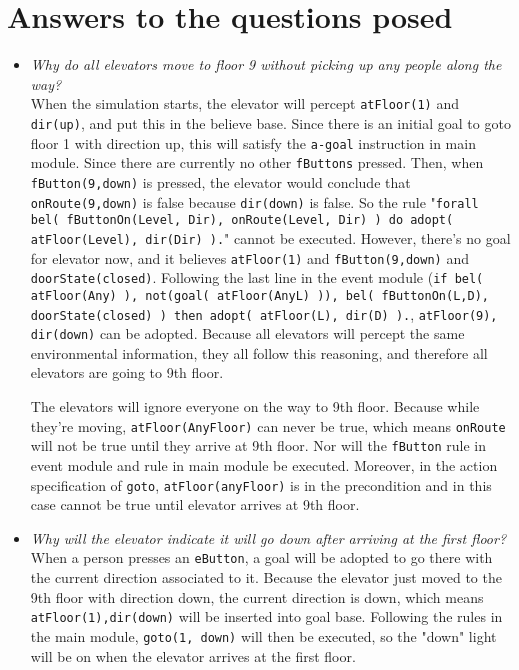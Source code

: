 \documentclass[a4paper,10pt,twocolumn]{article}
\begin{document}
\section{Answers to the questions posed}
\begin{itemize}
 \item \emph{Why do all elevators move to floor 9 without picking up any people along the way?}\\
 When the simulation starts, the elevator will percept \texttt{atFloor(1)} and \texttt{dir(up)}, and put this in the believe base. Since there is an initial goal to goto floor 1 with direction up, this will satisfy the \texttt{a-goal} instruction in main module. Since there are currently no other \texttt{fButtons} pressed. 
 Then, when \texttt{fButton(9,down)} is pressed, the elevator would conclude that \texttt{onRoute(9,down)} is false because \texttt{dir(down)} is false. So the rule "\texttt{forall bel( fButtonOn(Level, Dir), onRoute(Level, Dir) ) do adopt( atFloor(Level), dir(Dir) ).}" cannot be executed. However, there's no goal for elevator now, and it believes \texttt{atFloor(1)} and \texttt{fButton(9,down)} and \texttt{doorState(closed)}. Following the last line in the event module (\texttt{if bel( atFloor(Any) ), not(goal( atFloor(AnyL) )), bel( fButtonOn(L,D), doorState(closed) )
then adopt( atFloor(L), dir(D) ).}, \texttt{atFloor(9), dir(down)} can be adopted. 
Because all elevators will percept the same environmental information, they all follow this reasoning, and therefore all elevators are going to 9th floor. 

 The elevators will ignore everyone on the way to 9th floor. Because while they're moving, \texttt{atFloor(AnyFloor)} can never be true, which means \texttt{onRoute} will not be true until they arrive at 9th floor. Nor will the \texttt{fButton} rule in event module and rule in main module be executed. Moreover, in the action specification of \texttt{goto}, \texttt{atFloor(anyFloor)} is in the precondition and in this case cannot be true until elevator arrives at 9th floor.
 
 \item \emph{Why will the elevator indicate it will go down after arriving at the first floor?}\\
 When a person presses an \texttt{eButton}, a goal will be adopted to go there with the current direction associated to it. Because the elevator just moved to the 9th floor with direction down, the current direction is down, which means \texttt{atFloor(1),dir(down)} will be inserted into goal base. Following the rules in the main module, \texttt{goto(1, down)} will then be executed, so the "down" light will be on when the elevator arrives at the first floor.
\end{itemize}
\end{document}
